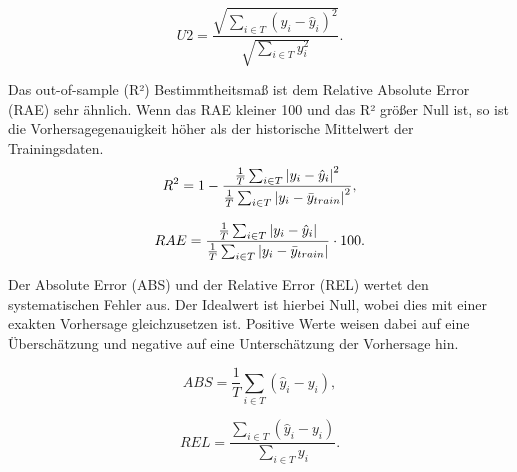 \begin{equation}
U2 = \frac{\sqrt{\sum_{i \in T} (y_i-\hat{y}_i)^2}}{ \sqrt{ \sum_{i \in T} y_i^2} }.
\label{gl:U2}
\end{equation}


Das out-of-sample (R²) Bestimmtheitsmaß ist dem Relative Absolute Error (RAE) sehr ähnlich. Wenn das RAE kleiner 100 und das R² größer Null ist, so ist die Vorhersagegenauigkeit höher als der historische Mittelwert der Trainingsdaten.
\begin{equation}
R^2 = 1 -  \frac{\frac{1}{T} \sum_{i \in T} \abs{y_i-\hat{y}_i}^2}{ \frac{1}{T} \sum_{i \in T} \abs{y_i-\bar{y}_{train}}^2 } ,
\label{gl:R2}
\end{equation}


\begin{equation}
RAE = \frac{\frac{1}{T} \sum_{i \in T} \abs{y_i-\hat{y}_i}}{ \frac{1}{T} \sum_{i \in T} \abs{y_i-\bar{y}_{train}} } \cdot 100 .
\label{gl:RAE}
\end{equation}


Der Absolute Error (ABS) und der Relative Error (REL) wertet den systematischen Fehler aus. Der Idealwert ist hierbei Null, wobei dies mit einer exakten Vorhersage gleichzusetzen ist. Positive Werte weisen dabei auf eine Überschätzung und negative auf eine Unterschätzung der Vorhersage hin.\,

\begin{equation}
ABS= \frac{1}{T} \sum\limits_{i \in T} (\hat{y}_i-y_i),
\label{gl:ABS}
\end{equation}


\begin{equation}
REL= \frac{\sum_{i \in T} (\hat{y}_i-y_i)}{\sum_{i \in T} y_i} .
\label{gl:REL}
\end{equation}



